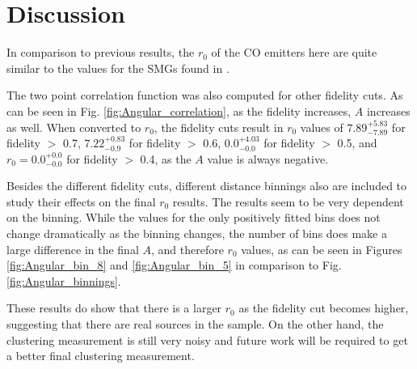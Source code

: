 
\section{Discussion}

In comparison to previous results, the $r_0$ of the CO emitters here are quite similar to the values for the SMGs found in \cite{10.1111/j.1365-2966.2011.20303.x}.


The two point correlation function was also computed for other fidelity cuts. As can be seen in Fig. \ref{fig:Angular_correlation}, as the fidelity increases, $A$ increases as well. When converted to $r_0$, the fidelity cuts result in $r_0$ values of $7.89_{-7.89}^{+5.83}$ for fidelity $>$ 0.7, $7.22_{-0.9}^{+0.83}$ for fidelity $>$ 0.6, $0.0_{-0.0}^{+4.03}$ for fidelity $>$ 0.5, and $r_0 = 0.0_{-0.0}^{+0.0}$ for fidelity $>$ 0.4, as the $A$ value is always negative. 

Besides the different fidelity cuts, different distance binnings also are included to study their effects on the final $r_0$ results. The results seem to be very dependent on the binning. While the values for the only positively fitted bins does not change dramatically as the binning changes, the number of bins does make a large difference in the final $A$, and therefore $r_0$ values, as can be seen in Figures \ref{fig:Angular_bin_8} and \ref{fig:Angular_bin_5} in comparison to Fig. \ref{fig:Angular_binnings}.

These results do show that there is a larger $r_0$ as the fidelity cut becomes higher, suggesting that there are real sources in the sample. On the other hand, the clustering measurement is still very noisy and future work will be required to get a better final clustering measurement.


